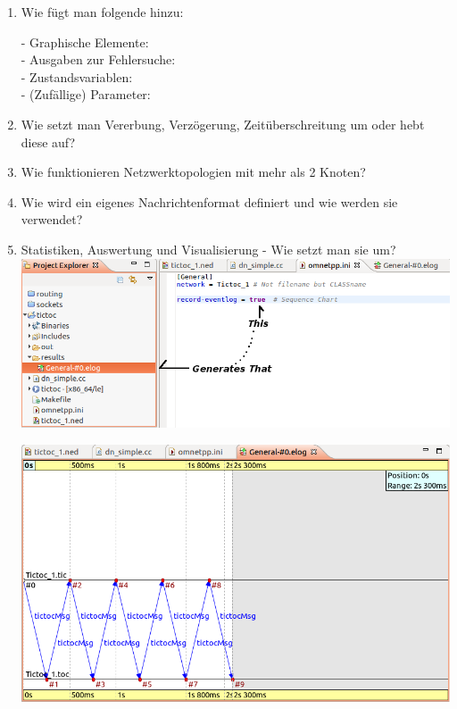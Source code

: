 \documentclass[11pt]{article}
\begin{document}
\begin{enumerate}[\thesubsection .1]
        \item Wie fügt man folgende hinzu:
        \begin{addmargin}[1em]{1em}
            - Graphische Elemente: \\
            - Ausgaben zur Fehlersuche: \\
            - Zustandsvariablen: \\
            - (Zufällige) Parameter:
        \end{addmargin}


        \item Wie setzt man Vererbung, Verzögerung, Zeitüberschreitung um oder hebt diese auf?\\


        \item Wie funktionieren Netzwerktopologien mit mehr als 2 Knoten?\\


        \item Wie wird ein eigenes Nachrichtenformat definiert und wie werden sie verwendet?\\


        \item Statistiken, Auswertung und Visualisierung - Wie setzt man sie um?\\

        \includegraphics[width=\textwidth]{charting1.png}

        \includegraphics[width=\textwidth]{charting2.png}


    \end{enumerate}
\end{document}
